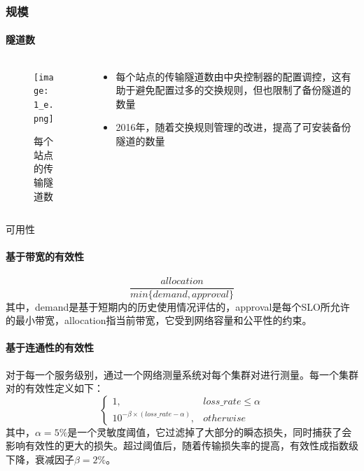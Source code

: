 \begin{frame}
    \frametitle{规模}
    \framesubtitle{隧道数}
    \begin{columns}
        \begin{column}{0.4\textwidth}
            \begin{figure}
                \centering
                \texttt{[image: 1\_e.png]}
                \caption{每个站点的传输隧道数}
            \end{figure}
        \end{column}

        \begin{column}{0.6\textwidth}
            \begin{itemize}
                \item 每个站点的传输隧道数由中央控制器的配置调控，这有助于避免配置过多的交换规则，但也限制了备份隧道的数量
                \item 2016年，随着交换规则管理的改进，提高了可安装备份隧道的数量
            \end{itemize}
        \end{column}
    \end{columns}
\end{frame}

\begin{frame}{可用性}
    \paragraph{基于带宽的有效性}
    \begin{equation*}
        \frac{allocation}{min\{demand, approval\}}
    \end{equation*}
    其中，demand是基于短期内的历史使用情况评估的，approval是每个SLO所允许的最小带宽，allocation指当前带宽，它受到网络容量和公平性的约束。
    \paragraph{基于连通性的有效性}对于每一个服务级别，通过一个网络测量系统对每个集群对进行测量。每一个集群对的有效性定义如下：
    \begin{equation*}
        \begin{cases}
            1,                                    & loss\_rate\leq\alpha \\
            10^{-\beta\times(loss\_rate-\alpha)}, & otherwise
        \end{cases}
    \end{equation*}
    其中，$\alpha=5\%$是一个灵敏度阈值，它过滤掉了大部分的瞬态损失，同时捕获了会影响有效性的更大的损失。超过阈值后，随着传输损失率的提高，有效性成指数级下降，衰减因子$\beta=2\%$。
\end{frame}

